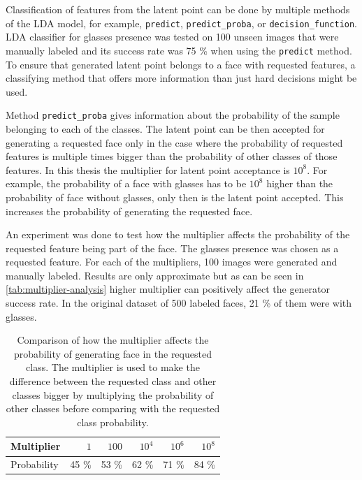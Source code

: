 Classification of features from the latent point can be done by multiple methods of the LDA model, for example, \texttt{predict}, \texttt{predict\_proba}, or \texttt{decision\_function}. LDA classifier for glasses presence was tested on 100 unseen images that were manually labeled and its success rate was 75 \% when using the \texttt{predict} method. To ensure that generated latent point belongs to a face with requested features, a classifying method that offers more information than just hard decisions might be used.

Method \texttt{predict\_proba} gives information about the probability of the sample belonging to each of the classes. The latent point can be then accepted for generating a requested face only in the case where the probability of requested features is multiple times bigger than the probability of other classes of those features. In this thesis the multiplier for latent point acceptance is $10^8$. For example, the probability of a face with glasses has to be $10^8$ higher than the probability of face without glasses, only then is the latent point accepted. This increases the probability of generating the requested face.

An experiment was done to test how the multiplier affects the probability of the requested feature being part of the face. The glasses presence was chosen as a requested feature. For each of the multipliers, 100 images were generated and manually labeled. Results are only approximate but as can be seen in \autoref{tab:multiplier-analysis} higher multiplier can positively affect the generator success rate. In the original dataset of 500 labeled faces, 21 \% of them were with glasses.

\begin{table}[!h]
    \begin{center}
        \begin{tabular}{|l||r|r|r|r|r|}
            \hline
            Multiplier & $1$ & $100$ & $10^4$ & $10^6$ & $10^8$ \\
            \hline
            Probability & 45 \% & 53 \% & 62 \% & 71 \% & 84 \% \\ 
            \hline
        \end{tabular}
    \end{center}
    \caption{\label{tab:multiplier-analysis}Comparison of how the multiplier affects the probability of generating face in the requested class. The multiplier is used to make the difference between the requested class and other classes bigger by multiplying the probability of other classes before comparing with the requested class probability.}
\end{table}

